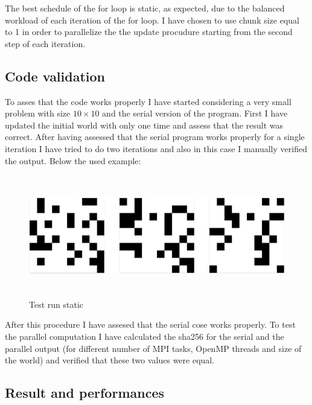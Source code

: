 \documentclass[
  letterpaper,
  DIV=11,
  numbers=noendperiod]{scrartcl}
\begin{document}
The best schedule of the for loop is static, as expected, due to the
balanced workload of each iteration of the for loop. I have chosen to
use chunk size equal to 1 in order to parallelize the the update
procudure starting from the second step of each iteration.

\hypertarget{code-validation}{%
\subsection{Code validation}\label{code-validation}}

To asses that the code works properly I have started considering a very
small problem with size \(10 \times 10\) and the serial version of the
program. First I have updated the initial world with only one time and
assess that the result was correct. After having assessed that the
serial program works properly for a single iteration I have tried to do
two iterations and also in this case I manually verified the output.
Below the used example:

\begin{figure}

{\centering \includegraphics[width=\textwidth,height=2.08333in]{img/test_static.png}

}

\caption{Test run static}

\end{figure}

After this procedure I have assesed that the serial cose works properly.
To test the parallel computation I have calculated the sha256 for the
serial and the parallel output (for different number of MPI tasks,
OpenMP threads and size of the world) and verified that these two values
were equal.

\hypertarget{result-and-performances}{%
\subsection{Result and performances}\label{result-and-performances}}
\end{document}
